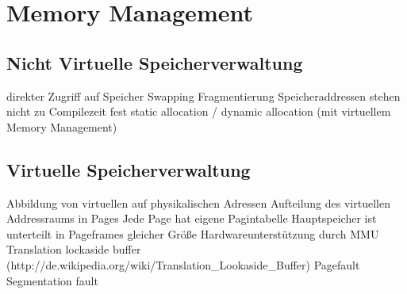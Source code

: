 \section{Memory Management}

\subsection*{Nicht Virtuelle Speicherverwaltung}

        direkter Zugriff auf Speicher
        Swapping
        Fragmentierung
        Speicheraddressen stehen nicht zu Compilezeit fest
        static allocation / dynamic allocation
     (mit virtuellem Memory Management)



\subsection*{Virtuelle Speicherverwaltung}

        Abbildung von virtuellen auf physikalischen Adressen
        Aufteilung des virtuellen Addressraums in Pages
        Jede Page hat eigene Pagintabelle
        Hauptspeicher ist unterteilt in Pageframes gleicher Größe
        Hardwareunterstützung durch MMU
        Translation lockaside buffer (http://de.wikipedia.org/wiki/Translation\_Lookaside\_Buffer)
        Pagefault
        Segmentation fault




